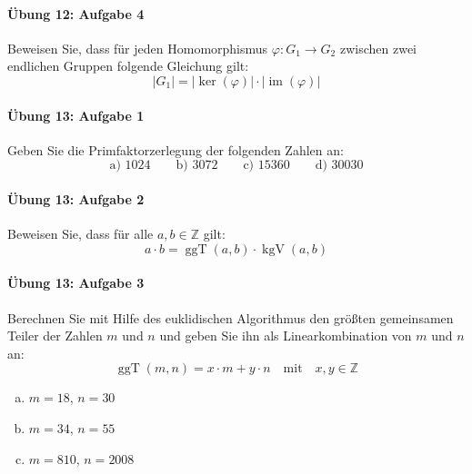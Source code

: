\documentclass
[
  draft    = true,
  fontsize = 11pt,
  parskip  = half-,
  BCOR     = 0pt,
  DIV      = 11,
  ngerman,
  dvipsnames
]
{scrartcl}
\begin{document}
\paragraph{Übung 12: Aufgabe 4}
Beweisen Sie, dass für jeden Homomorphismus $\varphi:G_1\rightarrow G_2$
zwischen zwei endlichen Gruppen folgende Gleichung gilt:
\begin{equation*}
  |G_1|=|\ker(\varphi)|\cdot|\operatorname{im}(\varphi)|
\end{equation*}

\paragraph{Übung 13: Aufgabe 1}
Geben Sie die Primfaktorzerlegung der folgenden Zahlen an:
\begin{equation*}
  \text{a) }1024
  \qquad
  \text{b) }3072
  \qquad
  \text{c) }15360
  \qquad
  \text{d) }30030
\end{equation*}

\paragraph{Übung 13: Aufgabe 2}
Beweisen Sie, dass für alle $a,b\in\mathbb{Z}$ gilt:
\begin{equation*}
  a\cdot b=\operatorname{ggT}(a,b)\cdot\operatorname{kgV}(a,b)
\end{equation*}

\paragraph{Übung 13: Aufgabe 3}
Berechnen Sie mit Hilfe des euklidischen Algorithmus den größten
gemeinsamen Teiler der Zahlen $m$ und $n$ und geben Sie
ihn als Linearkombination von $m$ und $n$ an:
\begin{equation*}
  \operatorname{ggT}(m,n)=x\cdot m+y\cdot n\quad\text{mit}\quad x,y\in\mathbb{Z}
\end{equation*}
\begin{enumerate}[a)]
  \item $m=18$, $n=30$
  \item $m=34$, $n=55$
  \item $m=810$, $n=2008$
\end{enumerate}
\end{document}
